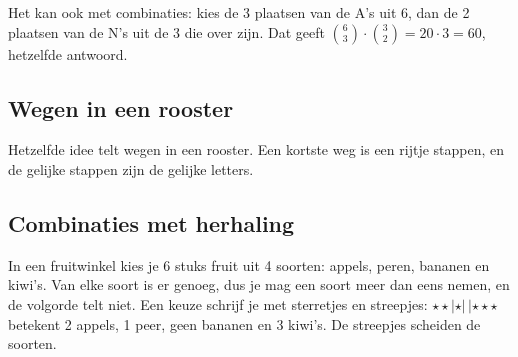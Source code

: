 Het kan ook met combinaties: kies de 3 plaatsen van de A's uit 6, dan de 2 plaatsen van de N's uit de 3 die over zijn. Dat geeft $\binom63 \cdot \binom32 = 20 \cdot 3 = 60$, hetzelfde antwoord.

\begin{oefeningen}
\end{oefeningen}

\subsection{Wegen in een rooster}

Hetzelfde idee telt wegen in een rooster. Een kortste weg is een rijtje stappen, en de gelijke stappen zijn de gelijke letters.


\begin{oefeningen}
\end{oefeningen}

\subsection{Combinaties met herhaling}

In een fruitwinkel kies je 6 stuks fruit uit 4 soorten: appels, peren, bananen en kiwi's. Van elke soort is er genoeg, dus je mag een soort meer dan eens nemen, en de volgorde telt niet. Een keuze schrijf je met sterretjes en streepjes: $\star\star|\star|\,|\star\star\star$ betekent 2 appels, 1 peer, geen bananen en 3 kiwi's. De streepjes scheiden de soorten.


